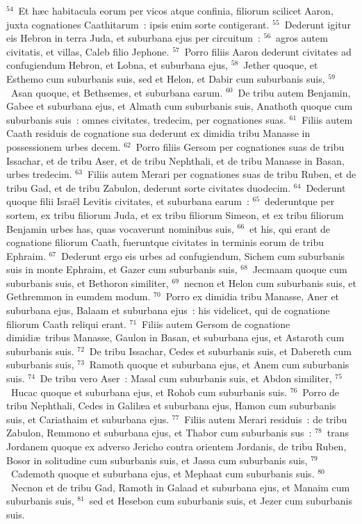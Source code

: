 ${}^{54}$~Et h\ae c habitacula eorum per vicos atque confinia, filiorum scilicet Aaron, juxta cognationes Caathitarum~: ipsis enim sorte contigerant.
${}^{55}$~Dederunt igitur eis Hebron in terra Juda, et suburbana ejus per circuitum~:
${}^{56}$~agros autem civitatis, et villas, Caleb filio Jephone.
${}^{57}$~Porro filiis Aaron dederunt civitates ad confugiendum Hebron, et Lobna, et suburbana ejus,
${}^{58}$~Jether quoque, et Esthemo cum suburbanis suis, sed et Helon, et Dabir cum suburbanis suis,
${}^{59}$~Asan quoque, et Bethsemes, et suburbana earum.
${}^{60}$~De tribu autem Benjamin, Gabee et suburbana ejus, et Almath cum suburbanis suis, Anathoth quoque cum suburbanis suis~: omnes civitates, tredecim, per cognationes suas.
${}^{61}$~Filiis autem Caath residuis de cognatione sua dederunt ex dimidia tribu Manasse in possessionem urbes decem.
${}^{62}$~Porro filiis Gersom per cognationes suas de tribu Issachar, et de tribu Aser, et de tribu Nephthali, et de tribu Manasse in Basan, urbes tredecim.
${}^{63}$~Filiis autem Merari per cognationes suas de tribu Ruben, et de tribu Gad, et de tribu Zabulon, dederunt sorte civitates duodecim.
${}^{64}$~Dederunt quoque filii Isra\"el Levitis civitates, et suburbana earum~:
${}^{65}$~dederuntque per sortem, ex tribu filiorum Juda, et ex tribu filiorum Simeon, et ex tribu filiorum Benjamin urbes has, quas vocaverunt nominibus suis,
${}^{66}$~et his, qui erant de cognatione filiorum Caath, fueruntque civitates in terminis eorum de tribu Ephraim.
${}^{67}$~Dederunt ergo eis urbes ad confugiendum, Sichem cum suburbanis suis in monte Ephraim, et Gazer cum suburbanis suis,
${}^{68}$~Jecmaam quoque cum suburbanis suis, et Bethoron similiter,
${}^{69}$~necnon et Helon cum suburbanis suis, et Gethremmon in eumdem modum.
${}^{70}$~Porro ex dimidia tribu Manasse, Aner et suburbana ejus, Balaam et suburbana ejus~: his videlicet, qui de cognatione filiorum Caath reliqui erant.
${}^{71}$~Filiis autem Gersom de cognatione dimidi\ae\ tribus Manasse, Gaulon in Basan, et suburbana ejus, et Astaroth cum suburbanis suis.
${}^{72}$~De tribu Issachar, Cedes et suburbanis suis, et Dabereth cum suburbanis suis,
${}^{73}$~Ramoth quoque et suburbana ejus, et Anem cum suburbanis suis.
${}^{74}$~De tribu vero Aser~: Masal cum suburbanis suis, et Abdon similiter,
${}^{75}$~Hucac quoque et suburbana ejus, et Rohob cum suburbanis suis.
${}^{76}$~Porro de tribu Nephthali, Cedes in Galil\ae a et suburbana ejus, Hamon cum suburbanis suis, et Cariathaim et suburbana ejus.
${}^{77}$~Filiis autem Merari residuis~: de tribu Zabulon, Remmono et suburbana ejus, et Thabor cum suburbanis sus~:
${}^{78}$~trans Jordanem quoque ex adverso Jericho contra orientem Jordanis, de tribu Ruben, Bosor in solitudine cum suburbanis suis, et Jassa cum suburbanis suis,
${}^{79}$~Cademoth quoque et suburbana ejus, et Mephaat cum suburbanis suis.
${}^{80}$~Necnon et de tribu Gad, Ramoth in Galaad et suburbana ejus, et Manaim cum suburbanis suis,
${}^{81}$~sed et Hesebon cum suburbanis suis, et Jezer cum suburbanis suis.

